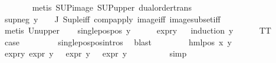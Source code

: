 \begin{isabellebody}
\ \ \ \ \ \ \isamarkupfalse%
\ {\isacharparenleft}{\kern0pt}metis\ SUP{\isacharunderscore}{\kern0pt}image\ SUP{\isacharunderscore}{\kern0pt}upper\ dual{\isacharunderscore}{\kern0pt}order{\isachardot}{\kern0pt}trans{\isacharparenright}{\kern0pt}\isanewline
\ \ \ \ \isamarkupfalse%
\ sup{\isacharunderscore}{\kern0pt}neg\ {\isacartoucheopen}y\ {\isasymin}\ {\isasymPhi}\ {\isacharbackquote}{\kern0pt}\ J{\isacartoucheclose}\ Sup{\isacharunderscore}{\kern0pt}le{\isacharunderscore}{\kern0pt}iff\ comp{\isacharunderscore}{\kern0pt}apply\ image{\isacharunderscore}{\kern0pt}iff\ image{\isacharunderscore}{\kern0pt}subset{\isacharunderscore}{\kern0pt}iff\isanewline
\ \ \ \ \isamarkupfalse%
\ {\isacharparenleft}{\kern0pt}metis\ Un{\isacharunderscore}{\kern0pt}upper{}{\isacharparenright}{\kern0pt}{\isacharplus}{\kern0pt}\isanewline
\ \ \isamarkupfalse%
\ {\isachardoublequoteopen}single{\isacharunderscore}{\kern0pt}pos{\isacharunderscore}{\kern0pt}pos\ y{\isachardoublequoteclose}\isanewline
\ \ \ \ \isamarkupfalse%
\ expr{\isacharunderscore}{\kern0pt}y\isanewline
\ \ \isamarkupfalse%
{\isacharparenleft}{\kern0pt}induction\ y{\isacharparenright}{\kern0pt}\isanewline
\ \ \ \ \isamarkupfalse%
\ TT\isanewline
\ \ \ \ \isamarkupfalse%
\ \isamarkupfalse%
\ {\isacharquery}{\kern0pt}case\ \isanewline
\ \ \ \ \ \ \isamarkupfalse%
\ single{\isacharunderscore}{\kern0pt}pos{\isacharunderscore}{\kern0pt}pos{\isachardot}{\kern0pt}intros{\isacharparenleft}{\kern0pt}{}{\isacharparenright}{\kern0pt}\ \isamarkupfalse%
\ blast\isanewline
\ \ \isamarkupfalse%
\isanewline
\ \ \ \ \isamarkupfalse%
\ {\isacharparenleft}{\kern0pt}hml{\isacharunderscore}{\kern0pt}pos\ x{}\ y{\isacharparenright}{\kern0pt}\isanewline
\ \ \ \ \isamarkupfalse%
\ expr{\isacharunderscore}{\kern0pt}y{\isacharcolon}{\kern0pt}\ {\isachardoublequoteopen}expr{\isacharunderscore}{\kern0pt}{}\ y\ {\isasymle}\ {}{\isachardoublequoteclose}\ {\isachardoublequoteopen}expr{\isacharunderscore}{\kern0pt}{}\ y\ {\isasymle}\ {}{\isachardoublequoteclose}\ {\isachardoublequoteopen}expr{\isacharunderscore}{\kern0pt}{}\ y\ {\isasymle}\ {}{\isachardoublequoteclose}\isanewline
\ \ \ \ \ \ \isamarkupfalse%
\ simp{\isacharplus}{\kern0pt}\isanewline
\ \ \ \ \isamarkupfalse%

\end{isabellebody}
